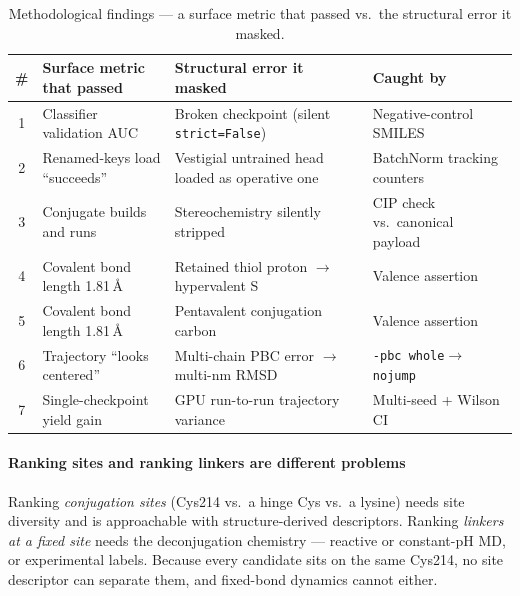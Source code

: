 \documentclass[10pt,twocolumn]{article}
\begin{document}
\begin{table}[t]
\caption{Methodological findings --- a surface metric that passed vs.\ the structural error it masked.}
\label{tab:findings}
\centering\footnotesize
\setlength{\tabcolsep}{6pt}
\renewcommand{\arraystretch}{1.15}
\begin{tabular}{@{}c >{\raggedright}p{4.6cm} >{\raggedright}p{5.4cm} >{\raggedright\arraybackslash}p{3.6cm}@{}}
\toprule
\rowcolor{tint}\sffamily\# & \sffamily Surface metric that passed & \sffamily Structural error it masked & \sffamily Caught by \\
\midrule
1 & Classifier validation AUC      & Broken checkpoint (silent \texttt{strict=False}) & Negative-control SMILES \\
2 & Renamed-keys load ``succeeds'' & Vestigial untrained head loaded as operative one & BatchNorm tracking counters \\
3 & Conjugate builds and runs      & Stereochemistry silently stripped               & CIP check vs.\ canonical payload \\
4 & Covalent bond length 1.81\,\AA & Retained thiol proton $\rightarrow$ hypervalent S & Valence assertion \\
5 & Covalent bond length 1.81\,\AA & Pentavalent conjugation carbon                  & Valence assertion \\
6 & Trajectory ``looks centered''  & Multi-chain PBC error $\rightarrow$ multi-nm RMSD & \texttt{-pbc whole}$\rightarrow$\texttt{nojump} \\
7 & Single-checkpoint yield gain   & GPU run-to-run trajectory variance              & Multi-seed + Wilson CI \\
\bottomrule
\end{tabular}
\end{table}

\paragraph{Ranking sites and ranking linkers are different problems}
Ranking \emph{conjugation sites} (Cys214 vs.\ a hinge Cys vs.\ a lysine) needs site diversity and is
approachable with structure-derived descriptors. Ranking \emph{linkers at a fixed site} needs the
deconjugation chemistry --- reactive or constant-pH MD, or experimental labels. Because every candidate
sits on the same Cys214, no site descriptor can separate them, and fixed-bond dynamics cannot either.
\end{document}
